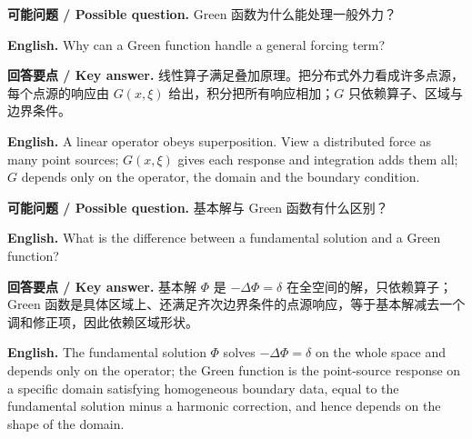 \documentclass[UTF8,11pt,a4paper]{ctexart}
\newcommand{\EN}[1]{\par\noindent \textbf{English.} #1\par}
\newcommand{\ASK}[4]{\par\noindent \textbf{可能问题 / Possible question.} #1\par\EN{#2}\noindent \textbf{回答要点 / Key answer.} #3\par\EN{#4}\medskip}
\begin{document}
\ASK{Green 函数为什么能处理一般外力？}{Why can a Green function handle a general forcing term?}{线性算子满足叠加原理。把分布式外力看成许多点源，每个点源的响应由 $G(x,\xi)$ 给出，积分把所有响应相加；$G$ 只依赖算子、区域与边界条件。}{A linear operator obeys superposition. View a distributed force as many point sources; $G(x,\xi)$ gives each response and integration adds them all; $G$ depends only on the operator, the domain and the boundary condition.}
\ASK{基本解与 Green 函数有什么区别？}{What is the difference between a fundamental solution and a Green function?}{基本解 $\Phi$ 是 $-\Delta\Phi=\delta$ 在全空间的解，只依赖算子；Green 函数是具体区域上、还满足齐次边界条件的点源响应，等于基本解减去一个调和修正项，因此依赖区域形状。}{The fundamental solution $\Phi$ solves $-\Delta\Phi=\delta$ on the whole space and depends only on the operator; the Green function is the point-source response on a specific domain satisfying homogeneous boundary data, equal to the fundamental solution minus a harmonic correction, and hence depends on the shape of the domain.}
\end{document}
